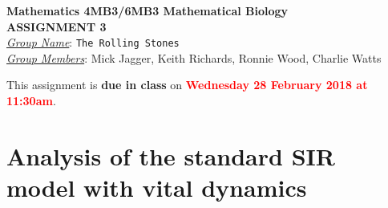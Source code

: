 \documentclass[12pt]{article}\usepackage[]{graphicx}\usepackage[]{color}
\begin{document}
\begin{center}
{\bf Mathematics 4MB3/6MB3 Mathematical Biology\\
 ASSIGNMENT 3}\\
\medskip
\underline{\emph{Group Name}}: \texttt{{\color{blue}The Rolling Stones}}\\
\medskip
\underline{\emph{Group Members}}: {\color{blue}Mick Jagger, Keith Richards, Ronnie Wood, Charlie Watts}
\end{center}

\bigskip
\noindent
This assignment is {\bfseries\color{red} due in class} on \textcolor{red}{\bf Wednesday 28 February 2018 at 11:30am}.

\bigskip

\section*{Analysis of the standard SIR model with vital dynamics}

\SIRintro
\end{document}
